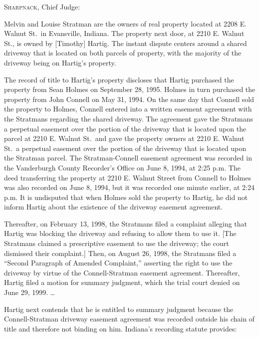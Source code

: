
\textsc{Sharpnack}, Chief Judge:

Melvin and Louise Stratman are the owners of real property located at 2208 E.
Walnut St.\ in Evansville, Indiana. The property next door, at 2210 E. Walnut
St., is owned by [Timothy] Hartig. The instant dispute centers around a shared
driveway that is located on both parcels of property, with the majority of the
driveway being on Hartig's property.

The record of title to Hartig's property discloses that Hartig purchased the
property from Sean Holmes on September 28, 1995. Holmes in turn purchased the
property from John Connell on May 31, 1994. On the same day that Connell sold
the property to Holmes, Connell entered into a written easement agreement with
the Stratmans regarding the shared driveway. The agreement gave the Stratmans a
perpetual easement over the portion of the driveway that is located upon the
parcel at 2210 E. Walnut St.\ and gave the property owners at 2210 E. Walnut
St.\ a perpetual easement over the portion of the driveway that is located upon
the Stratman parcel. The Stratman-Connell easement agreement was recorded in the
Vanderburgh County Recorder's Office on June 8, 1994, at 2:25 p.m. The deed
transferring the property at 2210 E. Walnut Street from Connell to Holmes was
also recorded on June 8, 1994, but it was recorded one minute earlier, at 2:24
p.m. It is undisputed that when Holmes sold the property to Hartig, he did not
inform Hartig about the existence of the driveway easement agreement.

Thereafter, on February 13, 1998, the Stratmans filed a complaint alleging that
Hartig was blocking the driveway and refusing to allow them to use it. [The
Stratmans claimed a prescriptive easement to use the driveway; the court
dismissed their complaint.] Then, on August 26, 1998, the Stratmans filed a
``Second Paragraph of Amended Complaint,'' asserting the right to use the
driveway by virtue of the Connell-Stratman easement agreement. Thereafter,
Hartig filed a motion for summary judgment, which the trial court denied on
June 29, 1999. \dots{} 


Hartig next contends that he is entitled to summary judgment because the
Connell-Stratman driveway easement agreement was recorded outside his chain of
title and therefore not binding on him. Indiana's recording statute provides: 


